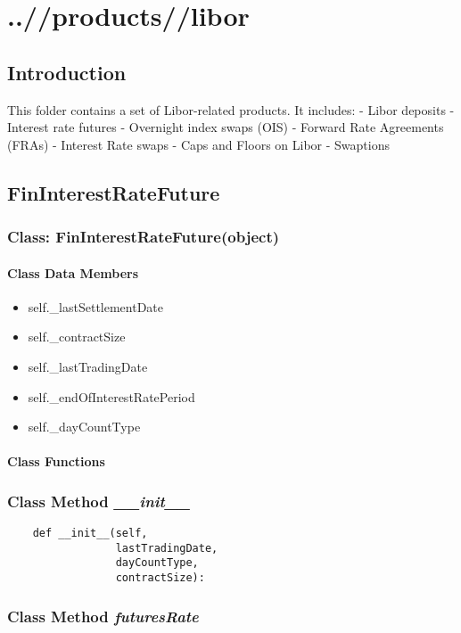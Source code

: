 \documentclass[twoside,11pt]{book}
\begin{document}
\chapter{..//products//libor}
\section{Introduction}
This folder contains a set of Libor-related products. It includes:
- Libor deposits
- Interest rate futures
- Overnight index swaps (OIS)
- Forward Rate Agreements (FRAs)
- Interest Rate swaps
- Caps and Floors on Libor
- Swaptions

\newpage
\section{FinInterestRateFuture}

\subsection{Class: FinInterestRateFuture(object)}


\subsubsection{Class Data Members}
\begin{itemize}
\item{self.\_lastSettlementDate}
\item{self.\_contractSize}
\item{self.\_lastTradingDate}
\item{self.\_endOfInterestRatePeriod}
\item{self.\_dayCountType}
\end{itemize}

\subsubsection{Class Functions}

\subsection{Class Method {\it \_\_init\_\_}}


\begin{lstlisting}
    def __init__(self, 
                 lastTradingDate,
                 dayCountType,
                 contractSize):
\end{lstlisting}

\subsection{Class Method {\it futuresRate}}
\end{document}
